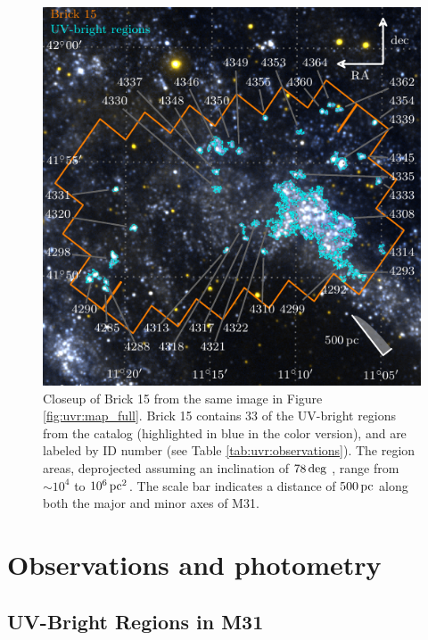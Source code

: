 \begin{figure}
\centering
\includegraphics[scale=1]{uv_regions-figures/map_b15.pdf}
\caption[Closeup of Brick 15.]{Closeup of Brick 15 from the same image in Figure \ref{fig:uvr:map_full}.
    Brick 15 contains 33 of the UV-bright regions from the \citet{Kang:2009}
    catalog (highlighted in blue in the color version), and are labeled by ID
    number (see Table \ref{tab:uvr:observations}). The region areas, deprojected
    assuming an inclination of $78\,\mathrm{deg}$ \citep{Tully:1994}, range from
    $\sim 10^4$ to $10^6\,\mathrm{pc}^2$. The scale bar indicates a distance of
    $500\,\mathrm{pc}$ along both the major and minor axes of M31.
}
\label{fig:uvr:map_b15}
\end{figure}





\section{Observations and photometry}\label{uvr:observations}

\subsection{UV-Bright Regions in M31}\label{uvr:observations.galex}

